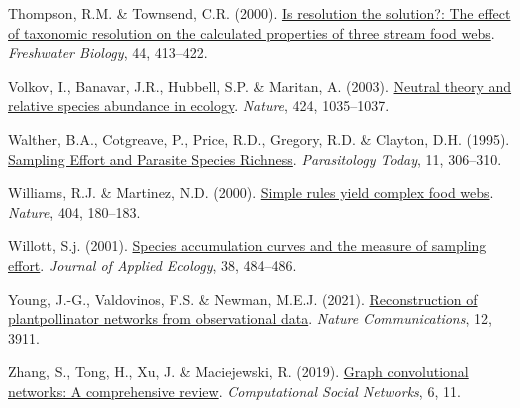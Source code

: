 \documentclass[10pt,oneside]{article}
\newlength{\cslhangindent}
\newenvironment{CSLReferences}[3] %
 {%
  \setlength{\parindent}{0pt}
  \ifodd #1 \everypar{\setlength{\hangindent}{\cslhangindent}}\ignorespaces\fi
  \ifnum #2 > 0
  \setlength{\parskip}{#2\baselineskip}
  \fi
 }%
 {}
\begin{document}
\begin{CSLReferences}{1}{0}
\leavevmode{}%
Thompson, R.M. \& Townsend, C.R. (2000).
\href{https://doi.org/10.1046/j.1365-2427.2000.00579.x}{Is resolution
the solution?: The effect of taxonomic resolution on the calculated
properties of three stream food webs}. \emph{Freshwater Biology}, 44,
413--422.

\leavevmode{}%
Volkov, I., Banavar, J.R., Hubbell, S.P. \& Maritan, A. (2003).
\href{https://doi.org/10.1038/nature01883}{Neutral theory and relative
species abundance in ecology}. \emph{Nature}, 424, 1035--1037.

\leavevmode{}%
Walther, B.A., Cotgreave, P., Price, R.D., Gregory, R.D. \& Clayton,
D.H. (1995).
\href{https://doi.org/10.1016/0169-4758(95)80047-6}{Sampling Effort and
Parasite Species Richness}. \emph{Parasitology Today}, 11, 306--310.

\leavevmode{}%
Williams, R.J. \& Martinez, N.D. (2000).
\href{https://doi.org/10.1038/35004572}{Simple rules yield complex food
webs}. \emph{Nature}, 404, 180--183.

\leavevmode{}%
Willott, S.j. (2001).
\href{https://doi.org/10.1046/j.1365-2664.2001.00589.x}{Species
accumulation curves and the measure of sampling effort}. \emph{Journal
of Applied Ecology}, 38, 484--486.

\leavevmode{}%
Young, J.-G., Valdovinos, F.S. \& Newman, M.E.J. (2021).
\href{https://doi.org/10.1038/s41467-021-24149-x}{Reconstruction of
plantpollinator networks from observational data}. \emph{Nature
Communications}, 12, 3911.

\leavevmode{}%
Zhang, S., Tong, H., Xu, J. \& Maciejewski, R. (2019).
\href{https://doi.org/10.1186/s40649-019-0069-y}{Graph convolutional
networks: A comprehensive review}. \emph{Computational Social Networks},
6, 11.

\end{CSLReferences}
\end{document}
